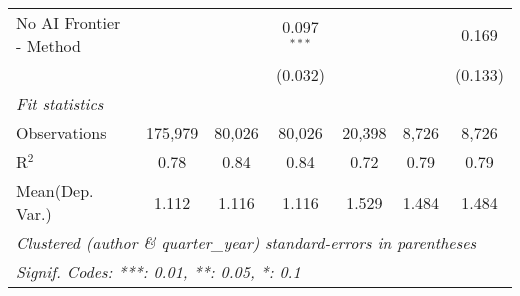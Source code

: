 \begin{tabular}{lcccccc}
   No AI Frontier - Method &               &             & 0.097$^{***}$ &               &         & 0.169\\   
                           &               &             & (0.032)       &               &         & (0.133)\\   
   \midrule
   \emph{Fit statistics}\\
   Observations            & 175,979       & 80,026      & 80,026        & 20,398        & 8,726   & 8,726\\  
   R$^2$                   & 0.78          & 0.84        & 0.84          & 0.72          & 0.79    & 0.79\\  
Mean(Dep. Var.) & 1.112 & 1.116 & 1.116 & 1.529 & 1.484 & 1.484 \\
   \midrule \midrule
   \multicolumn{7}{l}{\emph{Clustered (author \& quarter\_year) standard-errors in parentheses}}\\
   \multicolumn{7}{l}{\emph{Signif. Codes: ***: 0.01, **: 0.05, *: 0.1}}\\
\end{tabular}
\par\endgroup
